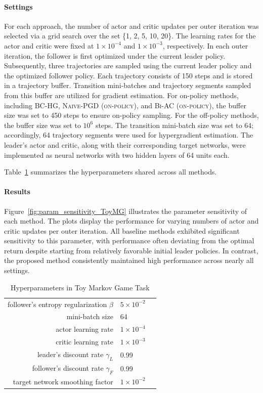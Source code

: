 \documentclass[letterpaper]{article} %
\begin{document}
\paragraph{Settings}
For each approach, the number of actor and critic updates per outer iteration was selected via a grid search over the set \{1, 2, 5, 10, 20\}.  
The learning rates for the actor and critic were fixed at $1 \times 10^{-4}$ and $1 \times 10^{-3}$, respectively.
In each outer iteration, the follower is first optimized under the current leader policy.  
Subsequently, three trajectories are sampled using the current leader policy and the optimized follower policy.  
Each trajectory consists of 150 steps and is stored in a trajectory buffer.  
Transition mini-batches and trajectory segments sampled from this buffer are utilized for gradient estimation.
For on-policy methods, including \textsc{BC-HG}, \textsc{Naive-PGD (on-policy)}, and \textsc{Bi-AC (on-policy)}, the buffer size was set to 450 steps to ensure on-policy sampling.  
For the off-policy methods, the buffer size was set to $10^6$ steps.  
The transition mini-batch size was set to 64; accordingly, 64 trajectory segments were used for hypergradient estimation.
The leader’s actor and critic, along with their corresponding target networks, were implemented as neural networks with two hidden layers of 64 units each.

Table~\ref{tab:params_ToyMG} summarizes the hyperparameters shared across all methods.

\paragraph{Results}
Figure~\ref{fig:param_sensitivity_ToyMG} illustrates the parameter sensitivity of each method.  
The plots display the performance for varying numbers of actor and critic updates per outer iteration.
All baseline methods exhibited significant sensitivity to this parameter, with performance often deviating from the optimal return despite starting from relatively favorable initial leader policies.  
In contrast, the proposed method consistently maintained high performance across nearly all settings.

\begin{table}[t]
    \centering
    \begin{tabular}{rll}\toprule
        follower's entropy regularization $\beta$ & $5\times10^{-2}$\\
        mini-batch size & 64\\
        actor learning rate & $1\times10^{-4}$\\
        critic learning rate & $1\times10^{-3}$\\
        leader’s discount rate $\gamma_L$ & 0.99\\
        follower’s discount rate $\gamma_F$ & 0.99\\
        target network smoothing factor & $1\times10^{-2}$\\ \bottomrule
    \end{tabular}
    \caption{Hyperparameters in Toy Markov Game Task}
    \label{tab:params_ToyMG}
\end{table}
\end{document}
